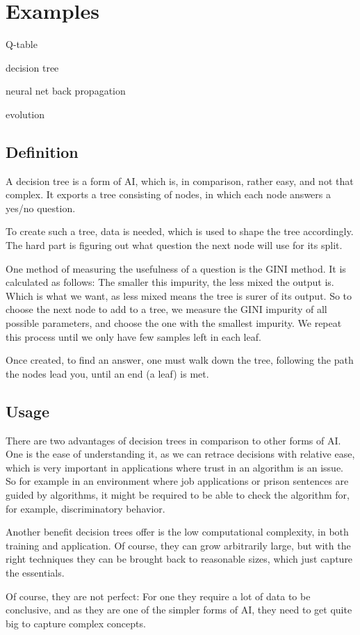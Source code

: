 \chapter{Examples}
Q-table %

decision tree %

neural net back propagation 

evolution

\section{Definition}

A decision tree is a form of AI, which is, in comparison, rather easy, and not that complex. It exports a tree consisting of nodes, in which each node answers a yes/no question. 

To create such a tree, data is needed, which is used to shape the tree accordingly.
The hard part is figuring out what question the next node will use for its split. 

One method of measuring the usefulness of a question is the GINI method.
It is calculated as follows: %
The smaller this impurity, the less mixed the output is. Which is what we want, as less mixed means the tree is surer of its output. 
So to choose the next node to add to a tree, we measure the GINI impurity of all possible parameters, and choose the one with the smallest impurity. We repeat this process until we only have few samples left in each leaf.

Once created, to find an answer, one must walk down the tree, following the path the nodes lead you, until an end (a leaf) is met.

\section{Usage}
There are two advantages of decision trees in comparison to other forms of AI. One is the ease of understanding it, as we can retrace decisions with relative ease, which is very important in applications where trust in an algorithm is an issue. So for example in an environment where job applications or prison sentences are guided by algorithms, it might be required to be able to check the algorithm for, for example, discriminatory behavior.

Another benefit decision trees offer is the low computational complexity, in both training and application. Of course, they can grow arbitrarily large, but with the right techniques %
they can be brought back to reasonable sizes, which just capture the essentials.

Of course, they are not perfect: For one they require a lot of data to be conclusive, and as they are one of the simpler forms of AI, they need to get quite big to capture complex concepts.